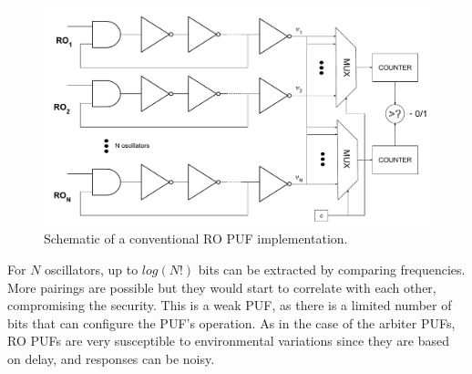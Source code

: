 \begin{figure}[H]
    \centering
    \includegraphics[width=14cm]{images/Ring oscillator.pdf}
    \caption{Schematic of a conventional RO PUF implementation.}
    \label{fig:ring oscillator}
\end{figure}

For $N$ oscillators, up to $log(N!)$ bits can be extracted by comparing frequencies. More pairings are possible but they would start to correlate with each other, compromising the security. This is a weak PUF, as there is a limited number of bits that can configure the PUF's operation. As in the case of the arbiter PUFs, RO PUFs are very susceptible to environmental variations since they are based on delay, and responses can be noisy. 






